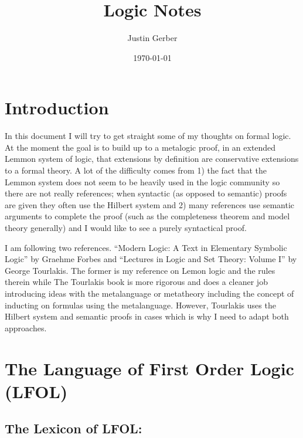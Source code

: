 \documentclass[12pt]{article}
\begin{document}
\title{Logic Notes}
\author{Justin Gerber}
\date{\today}
\maketitle

\section*{Introduction}

In this document I will try to get straight some of my thoughts on formal logic. At the moment the goal is to build up to a metalogic proof, in an extended Lemmon system of logic, that extensions by definition are conservative extensions to a formal theory. A lot of the difficulty comes from 1) the fact that the Lemmon system does not seem to be heavily used in the logic community so there are not really references; when syntactic (as opposed to semantic) proofs are given they often use the Hilbert system and 2) many references use semantic arguments to complete the proof (such as the completeness theorem and model theory generally) and I would like to see a purely syntactical proof.

I am following two references. ``Modern Logic: A Text in Elementary Symbolic Logic'' by Graehme Forbes and ``Lectures in Logic and Set Theory: Volume I'' by George Tourlakis. The former is my reference on Lemon logic and the rules therein while The Tourlakis book is more rigorous and does a cleaner job introducing ideas with the metalanguage or metatheory including the concept of inducting on formulas using the metalanguage. However, Tourlakis uses the Hilbert system and semantic proofs in cases which is why I need to adapt both approaches.

\hrulefill
\section*{The Language of First Order Logic (LFOL)}

\subsection*{The Lexicon of LFOL:}
\end{document}
